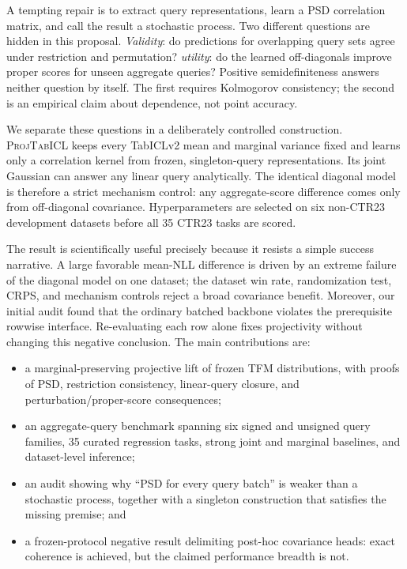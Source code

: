 \documentclass{article}
\newcommand{\method}{\textsc{ProjTabICL}}
\begin{document}
A tempting repair is to extract query representations, learn a PSD
correlation matrix, and call the result a stochastic process.  Two different
questions are hidden in this proposal.  \emph{Validity}: do predictions for
overlapping query sets agree under restriction and permutation?
\emph{utility}: do the learned off-diagonals improve proper scores for
unseen aggregate queries?  Positive semidefiniteness answers neither question
by itself.  The first requires Kolmogorov consistency; the second is an
empirical claim about dependence, not point accuracy.

We separate these questions in a deliberately controlled construction.
\method{} keeps every TabICLv2 mean and marginal variance fixed and learns
only a correlation kernel from frozen, singleton-query representations.  Its
joint Gaussian can answer any linear query analytically.  The identical
diagonal model is therefore a strict mechanism control: any aggregate-score
difference comes only from off-diagonal covariance.  Hyperparameters are
selected on six non-CTR23 development datasets before all 35 CTR23 tasks are
scored.

The result is scientifically useful precisely because it resists a simple
success narrative.  A large favorable mean-NLL difference is driven by an
extreme failure of the diagonal model on one dataset; the dataset win rate,
randomization test, CRPS, and mechanism controls reject a broad covariance
benefit.  Moreover, our initial audit found that the ordinary batched backbone
violates the prerequisite rowwise interface.  Re-evaluating each row alone
fixes projectivity without changing this negative conclusion.  The main
contributions are:

\begin{itemize}
  \item a marginal-preserving projective lift of frozen TFM distributions,
  with proofs of PSD, restriction consistency, linear-query closure, and
  perturbation/proper-score consequences;
  \item an aggregate-query benchmark spanning six signed and unsigned query
  families, 35 curated regression tasks, strong joint and marginal baselines,
  and dataset-level inference;
  \item an audit showing why ``PSD for every query batch'' is weaker than a
  stochastic process, together with a singleton construction that satisfies
  the missing premise; and
  \item a frozen-protocol negative result delimiting post-hoc covariance heads:
  exact coherence is achieved, but the claimed performance breadth is not.
\end{itemize}
\end{document}
